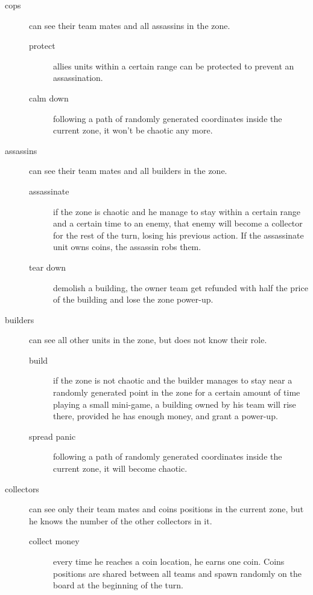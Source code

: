 			\begin{description}
				\item[cops] can see their team mates and all assassins in the zone.
					\begin{description}
						\item[protect] allies units within a certain range can be protected to prevent an assassination.
						\item[calm down] following a path of randomly generated coordinates inside the current zone, it won't be chaotic any more.
					\end{description}
				\item[assassins] can see their team mates and all builders in the zone.
					\begin{description}
						\item[assassinate] if the zone is chaotic and he manage to stay within a certain range and a certain time to an enemy, that enemy will become a collector for the rest of the turn, losing his previous action. If the assassinate unit owns coins, the assassin robs them.
						\item[tear down] demolish a building, the owner team get refunded with half the price of the building and lose the zone power-up.
					\end{description}
				\item[builders] can see all other units in the zone, but does not know their role.
					\begin{description}
						\item[build] if the zone is not chaotic and the builder manages to stay near a randomly generated point in the zone for a certain amount of time playing a small mini-game, a building owned by his team will rise there, provided he has enough money, and grant a power-up.
						\item[spread panic] following a path of randomly generated coordinates inside the current zone, it will become chaotic.
					\end{description}
				\item[collectors] can see only their team mates and coins positions in the current zone, but he knows the number of the other collectors in it.
					\begin{description}
						\item[collect money] every time he reaches a coin location, he earns one coin. Coins positions are shared between all teams and spawn randomly on the board at the beginning of the turn.
					\end{description}
			\end{description}
			
